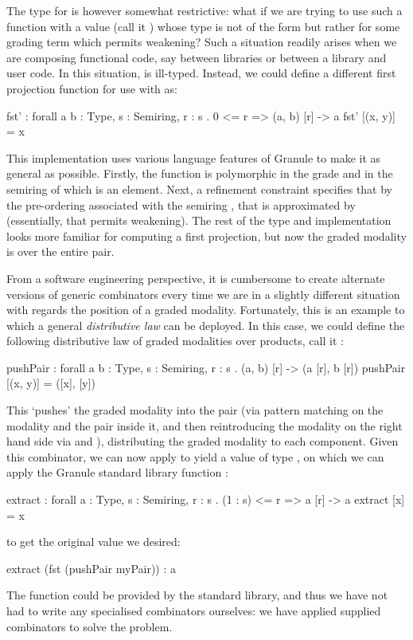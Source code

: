 The type for  is however somewhat restrictive: what if we are trying
to use such a function with a value (call it ) whose type is not
of the form  but rather  for some grading
term  which permits weakening? Such a situation readily arises when we
are composing functional code, say between libraries or between a library and
user code. In this situation,  is ill-typed. Instead, we
could define a different first projection function for use with  as:
%
\begin{granule}
fst' : forall { a b : Type, s : Semiring, r : s } 
     . {0 <= r} => (a, b) [r] -> a
fst' [(x, y)] = x
\end{granule}
%
This implementation uses various language features of Granule to make it as
general as possible. Firstly, the function is polymorphic in the grade
 and in the semiring  of which  is an element.
Next, a refinement constraint  specifies that by the pre-ordering
\granin{<=} associated with the semiring , that  is
approximated by  (essentially, that  permits weakening). The
rest of the type and implementation looks more familiar for computing a first
projection, but now the graded modality is over the entire pair.

From a software engineering perspective, it is cumbersome to create alternate
versions of generic combinators every time we are in a slightly different
situation with regards the position of a graded modality.  Fortunately, this is
an example to which a general \emph{distributive law} can be deployed. In this
case, we could define the following distributive law of graded modalities over
products, call it :
%
\begin{granule}
pushPair : forall { a b : Type, s : Semiring, r : s } 
         . (a, b) [r] -> (a [r], b [r])
pushPair [(x, y)] = ([x], [y])
\end{granule}
%
This `pushes' the graded modality  into the pair (via pattern matching
on the modality and the pair inside it, and then reintroducing the modality on
the right hand side via \granin{[x]} and \granin{[y]}), distributing the graded
modality to each component. Given this combinator, we can now apply  to yield a value of type , on which we can
apply the Granule standard library function :
\begin{granule}
extract : forall { a : Type, s : Semiring, r : s }
        . {(1 : s) <= r} => a [r] -> a
extract [x] = x
\end{granule}
 to get the original  value we desired:
%
\begin{granule}
extract (fst (pushPair myPair)) : a
\end{granule}
%
The  function could be provided by the standard library, and
thus we have not had to write any specialised combinators ourselves: we have
applied supplied combinators to solve the problem.

